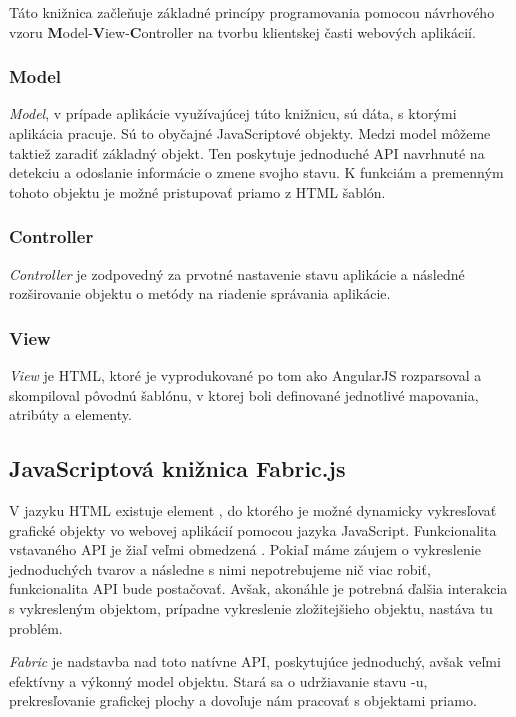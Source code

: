 Táto knižnica začleňuje základné princípy programovania pomocou návrhového vzoru \textbf{M}odel-\textbf{V}iew-\textbf{C}ontroller na tvorbu klientskej časti webových aplikácií.

\subsubsection{Model}
\textit{Model}, v prípade aplikácie využívajúcej túto knižnicu, sú dáta, s ktorými aplikácia pracuje. Sú to obyčajné JavaScriptové objekty. Medzi model môžeme taktiež zaradiť základný  objekt. Ten poskytuje jednoduché API navrhnuté na detekciu a odoslanie informácie o zmene svojho stavu. K funkciám a premenným tohoto objektu je možné pristupovať priamo z HTML šablón.

\subsubsection{Controller}
\textit{ Controller} je zodpovedný za prvotné nastavenie stavu aplikácie a následné rozširovanie  objektu o metódy na riadenie správania aplikácie.

\subsubsection{View}
\textit{View} je HTML, ktoré je vyprodukované po tom ako AngularJS rozparsoval a skompiloval pôvodnú šablónu, v ktorej boli definované jednotlivé mapovania, atribúty a elementy.

\subsection{JavaScriptová knižnica Fabric.js}\label{sec:fabric}

V jazyku HTML existuje element , do ktorého je možné dynamicky vykresľovať grafické objekty vo webovej aplikácií pomocou jazyka JavaScript. Funkcionalita vstavaného API je žiaľ veľmi obmedzená \cite{cabanier2014html}. Pokiaľ máme záujem o vykreslenie jednoduchých tvarov a následne s nimi nepotrebujeme nič viac robiť, funkcionalita API bude postačovať. Avšak, akonáhle je potrebná ďalšia interakcia s vykresleným objektom, prípadne vykreslenie zložitejšieho objektu, nastáva tu problém.

\textit{Fabric} je nadstavba nad toto natívne API, poskytujúce jednoduchý, avšak veľmi efektívny a výkonný model objektu. Stará sa o udržiavanie stavu -u, prekresľovanie grafickej plochy a dovoľuje nám pracovať s objektami priamo.


